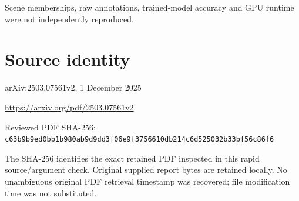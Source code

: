 \documentclass[11pt]{article}
\begin{document}
Scene memberships, raw annotations, trained-model accuracy and GPU runtime were not independently reproduced.\par

\section*{Source identity}

arXiv:2503.07561v2, 1 December 2025

\url{https://arxiv.org/pdf/2503.07561v2}

Reviewed PDF SHA-256: \nolinkurl{c63b9b9ed0bb1b980ab9d9dd3f06e9f3756610db214c6d525032b33bf56c86f6}

The SHA-256 identifies the exact retained PDF inspected in this rapid source/argument check. Original supplied report bytes are retained locally. No unambiguous original PDF retrieval timestamp was recovered; file modification time was not substituted.
\end{document}
